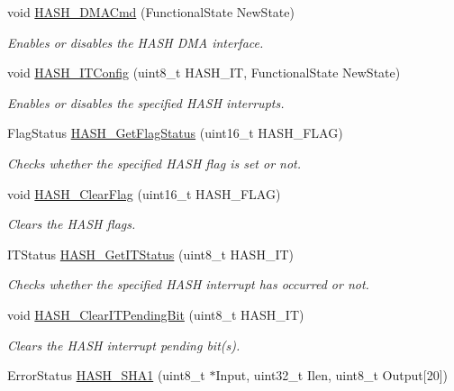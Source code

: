 \begin{DoxyCompactItemize}
void \hyperlink{group___h_a_s_h_ga6bc756803b0b3a03eecc47cb570e1bd3}{H\-A\-S\-H\-\_\-\-D\-M\-A\-Cmd} (Functional\-State New\-State)
\begin{DoxyCompactList}\small\item\em Enables or disables the H\-A\-S\-H D\-M\-A interface. \end{DoxyCompactList}\item 
void \hyperlink{group___h_a_s_h_gaed111ba67a4f4afc8c9cf389adc574ac}{H\-A\-S\-H\-\_\-\-I\-T\-Config} (uint8\-\_\-t H\-A\-S\-H\-\_\-\-I\-T, Functional\-State New\-State)
\begin{DoxyCompactList}\small\item\em Enables or disables the specified H\-A\-S\-H interrupts. \end{DoxyCompactList}\item 
Flag\-Status \hyperlink{group___h_a_s_h_gae994fb4be1977f6ebb823f38839f7bd1}{H\-A\-S\-H\-\_\-\-Get\-Flag\-Status} (uint16\-\_\-t H\-A\-S\-H\-\_\-\-F\-L\-A\-G)
\begin{DoxyCompactList}\small\item\em Checks whether the specified H\-A\-S\-H flag is set or not. \end{DoxyCompactList}\item 
void \hyperlink{group___h_a_s_h_ga0ec1269a1f30a1e7be0e3045d72ebcf6}{H\-A\-S\-H\-\_\-\-Clear\-Flag} (uint16\-\_\-t H\-A\-S\-H\-\_\-\-F\-L\-A\-G)
\begin{DoxyCompactList}\small\item\em Clears the H\-A\-S\-H flags. \end{DoxyCompactList}\item 
I\-T\-Status \hyperlink{group___h_a_s_h_ga49a9d1ad196112cd3614b8c428a4c4cf}{H\-A\-S\-H\-\_\-\-Get\-I\-T\-Status} (uint8\-\_\-t H\-A\-S\-H\-\_\-\-I\-T)
\begin{DoxyCompactList}\small\item\em Checks whether the specified H\-A\-S\-H interrupt has occurred or not. \end{DoxyCompactList}\item 
void \hyperlink{group___h_a_s_h_ga97b9508f09c6fb572f65832f124da26d}{H\-A\-S\-H\-\_\-\-Clear\-I\-T\-Pending\-Bit} (uint8\-\_\-t H\-A\-S\-H\-\_\-\-I\-T)
\begin{DoxyCompactList}\small\item\em Clears the H\-A\-S\-H interrupt pending bit(s). \end{DoxyCompactList}\item 
Error\-Status \hyperlink{group___h_a_s_h_ga2728c02c36de6d800e1ede56ea7789cb}{H\-A\-S\-H\-\_\-\-S\-H\-A1} (uint8\-\_\-t $\ast$Input, uint32\-\_\-t Ilen, uint8\-\_\-t Output\mbox{[}20\mbox{]})

\end{DoxyCompactItemize}
